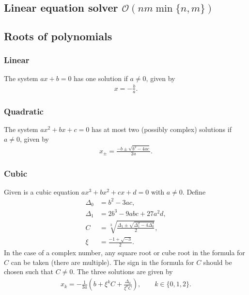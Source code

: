 \subsection{Linear equation solver $\mathcal O(nm\min\{n, m\})$}




\subsection{Roots of polynomials}

\subsubsection{Linear}
The system $ax + b = 0$ has one solution if $a \neq 0$, given by
\begin{align*}
    x = - \frac ba.
\end{align*}

\subsubsection{Quadratic}
The system $ax^2 + bx + c = 0$ has at most two (possibly complex) solutions if $a \neq 0$, given by
\begin{align*}
    x_\pm = \frac{-b \pm \sqrt{b^2 - 4ac}}{2a}.
\end{align*}

\subsubsection{Cubic}
Given is a cubic equation $ax^3 + bx^2 + cx + d = 0$ with $a \neq 0$. Define
\begin{align*}
    \Delta_0 &= b^2 - 3ac, \\
    \Delta_1 &= 2b^3 - 9abc + 27a^2d, \\
    C &= \sqrt[3]{\frac{\Delta_1 \pm \sqrt{\Delta_1^2 - 4\Delta_0^3}}2}, \\
    \xi &= \frac{-1 + \sqrt{-3}}2.
\end{align*}
In the case of a complex number, any square root or cube root in the formula for $C$ can be taken (there are multiple). The sign in the formula for $C$ should be chosen such that $C \neq 0$. The three solutions are given by
\begin{align*}
    x_k = -\frac1{3a}\left(b + \xi^kC + \frac{\Delta_0}{\xi^k C}\right), \qquad k \in \{0, 1, 2\}.
\end{align*}





